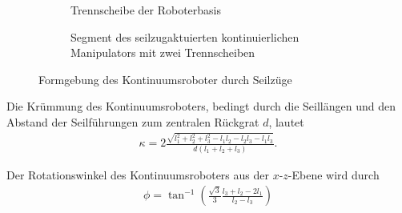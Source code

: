 \newsavebox{\imagebox} 
\begin{figure}[htb!]
\begin{subfigure}[t]{0.48\textwidth}
\centering\raisebox{\dimexpr.5\ht\imagebox-.5\height}{
	\def\svgwidth{\textwidth}
	
}
\caption{Trennscheibe der Roboterbasis}
\end{subfigure}
\begin{subfigure}[t]{0.48\textwidth}
\centering
\def\svgwidth{\textwidth}

\caption{Segment des seilzugaktuierten kontinuierlichen Manipulators mit zwei Trennscheiben}
\end{subfigure}
\caption[Formgebung des Kontinuumsroboter durch Seilzüge]{Formgebung des Kontinuumsroboter durch Seilzüge}
\label{fig:roboterdesign}
\end{figure}

Die Krümmung des Kontinuumsroboters, bedingt durch die Seillängen und den Abstand der Seilführungen zum zentralen Rückgrat $d$, lautet
\begin{align}
\kappa = 2\frac{\sqrt{l_1^2+l_2^2+l_3^2-l_1l_2-l_2l_3-l_1l_3}}{d(l_1+l_2+l_3)}.
\label{eq:kappa}
\end{align}

Der Rotationswinkel des Kontinuumsroboters aus der $x$-$z$-Ebene wird durch
\begin{align}
\phi = \tan^{-1}\left(\frac{\sqrt{3}}{3} \frac{l_3+l_2-2l_1}{l_2-l_3} \right)
\label{eq:phi}
\end{align}

